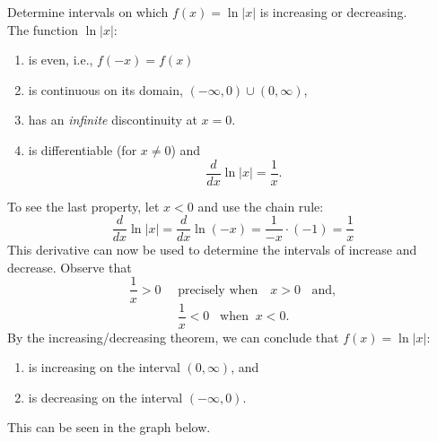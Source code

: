 \documentclass[handout]{ximera}
\begin{document}
\begin{example}[example 6]
Determine intervals on which $f(x) = \ln|x|$ is increasing or decreasing.\\

The function $\ln|x|:$

\begin{enumerate}
  \item is even, i.e., $f(-x) = f(x)$
  \item   is continuous on its domain, $(-\infty,0) \cup (0,\infty)$, 
  \item   has an {\it infinite} discontinuity at $x = 0$. 
  \item  is differentiable (for $x \neq 0$) and
                 $$ \frac{d}{dx} \ln|x| = \frac{1}{x}. $$
                 
                 
      
              
\end{enumerate}
To see the last property, let $x<0$ and use the chain rule:
\[
		\frac{d}{dx} \ln|x|= \frac{d}{dx} \ln(-x) = \frac{1}{-x}\cdot(-1) = \frac{1}{x}
\]
This derivative can now be used to determine the intervals of increase and decrease.
Observe that
$$ \frac{1}{x} > 0 \quad \text{ precisely when} \quad x >0  \;\;\text{ and},$$
$$ \frac{1}{x} <0 \;\;\; \text{when} \;\; x <0.$$
By the increasing/decreasing theorem, we can conclude that $f(x) = \ln|x|$:
\begin{enumerate}
  \item is increasing on the interval $(0, \infty)$, and
  \item   is decreasing on the interval $(-\infty, 0)$.                                 
\end{enumerate}
This can be seen in the graph below.

\begin{image}
\end{image}

\end{example}
\end{document}
